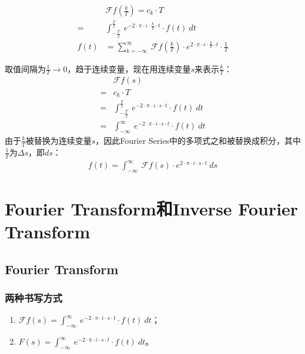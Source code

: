 \begin{align*}
	     & \mathcal{F}f(\frac{k}{T})   =    c_k\cdot T                                                                                      \\
	=    & \int_{-\frac{T}{2}}^{\frac{T}{2}}\ e^{-2\cdot \pi\cdot i\cdot \frac{k}{T}\cdot t}\cdot f(t)\ dt                                  \\
	f(t) & =\sum\limits_{k=-\infty}^{\infty}\ \mathcal{F}f(\frac{k}{T})\cdot e^{2\cdot \pi\cdot i\cdot \frac{k}{T}\cdot t}\cdot \frac{1}{T}
\end{align*}

取值间隔为$\frac{1}{T}\rightarrow 0$，趋于连续变量，现在用连续变量$s$来表示$\frac{k}{T}$：
\begin{align*}
	  & \mathcal{F}f(s)                                                                       \\
	= & c_k\cdot T                                                                            \\
	= & \int_{-\frac{T}{2}}^{\frac{T}{2}}\ e^{-2\cdot \pi\cdot i\cdot s\cdot t}\cdot f(t)\ dt \\
	= & \int_{-\infty}^{\infty}\ e^{-2\cdot \pi\cdot i\cdot s\cdot t}\cdot f(t)\ dt
\end{align*}
由于$\frac{k}{T}$被替换为连续变量$s$，因此Fourier Series中的多项式之和被替换成积分，其中$\frac{1}{T}$为$\Delta s$，即$ds$：
\begin{align*}
	f(t)   =  \int_{-\infty}^{\infty}\ \mathcal{F}f(s)\cdot e^{2\cdot \pi\cdot i\cdot s\cdot t}\ ds
\end{align*}
\section{Fourier Transform和Inverse Fourier Transform}
\subsection{Fourier Transform}
\subsubsection{两种书写方式}
\begin{enumerate}
	\item $\mathcal{F}f(s)=\int_{-\infty}^{\infty}\ e^{-2\cdot \pi\cdot i\cdot s\cdot t}\cdot f(t)\ dt$；
	\item $F(s)=\int_{-\infty}^{\infty}\ e^{-2\cdot \pi\cdot i\cdot s\cdot t}\cdot f(t)\ dt$。
\end{enumerate}
